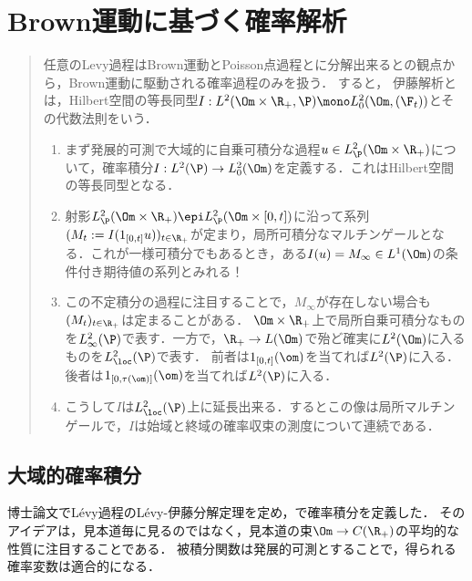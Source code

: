 \documentclass[uplatex,dvipdfmx]{jsreport}
\begin{document}
\chapter{Brown運動に基づく確率解析}

\begin{quotation}
    任意のLevy過程はBrown運動とPoisson点過程とに分解出来るとの観点から，Brown運動に駆動される確率過程のみを扱う．
    すると，
    伊藤解析とは，Hilbert空間の等長同型$I:L^2(\Om\times\R_+,\P)\mono L^2_0(\Om,(\F_t))$とその代数法則をいう．
    \begin{enumerate}
        \item まず発展的可測で大域的に自乗可積分な過程$u\in L^2_\P(\Om\times\R_+)$について，確率積分$I:L^2(\P)\to L^2_0(\Om)$を定義する．これはHilbert空間の等長同型となる．
        \item 射影$L^2_\P(\Om\times\R_+)\epi L^2_\P(\Om\times[0,t])$に沿って系列$(M_t:=I(1_{[0,t]}u))_{t\in\R_+}$が定まり，局所可積分なマルチンゲールとなる．これが一様可積分でもあるとき，ある$I(u)=M_\infty\in L^1(\Om)$の条件付き期待値の系列とみれる！
        \item この不定積分の過程に注目することで，$M_\infty$が存在しない場合も$(M_t)_{t\in\R_+}$は定まることがある．
        $\Om\times\R_+$上で局所自乗可積分なものを$L^2_\infty(\P)$で表す．一方で，$\R_+\to L(\Om)$で殆ど確実に$L^2(\Om)$に入るものを$L^2_\loc(\P)$で表す．
        前者は$1_{[0,t]}(\om)$を当てれば$L^2(\P)$に入る．後者は$1_{[0,\tau(\om)]}(\om)$を当てれば$L^2(\P)$に入る．
        \item こうして$I$は$L^2_\loc(\P)$上に延長出来る．するとこの像は局所マルチンゲールで，$I$は始域と終域の確率収束の測度について連続である．
    \end{enumerate}
\end{quotation}

\section{大域的確率積分}

\begin{tcolorbox}[colframe=ForestGreen, colback=ForestGreen!10!white,breakable,colbacktitle=ForestGreen!40!white,coltitle=black,fonttitle=\bfseries\sffamily,
title=]
    博士論文\cite{Ito42}でLévy過程のLévy-伊藤分解定理を定め，\cite{Ito44}で確率積分を定義した．
    そのアイデアは，見本道毎に見るのではなく，見本道の束$\Om\to C(\R_+)$の平均的な性質に注目することである．
    被積分関数は発展的可測とすることで，得られる確率変数は適合的になる．
\end{tcolorbox}
\end{document}
